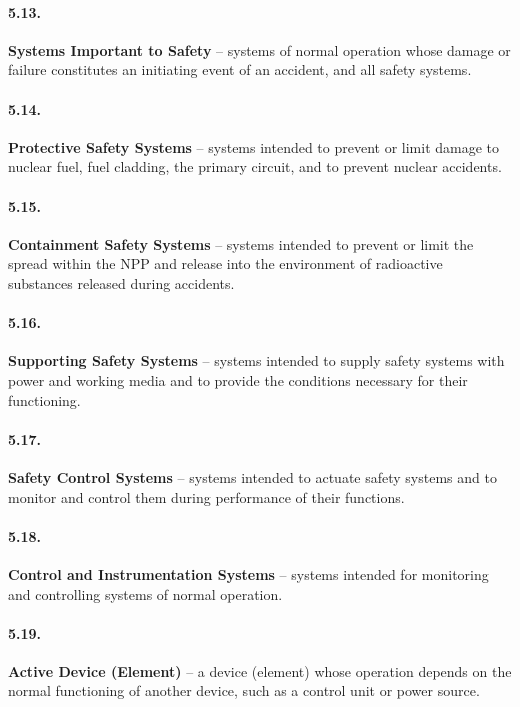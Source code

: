\documentclass[openright]{bookest}
\begin{document}
\paragraph{5.13.}
\textbf{Systems Important to Safety} -- systems of normal operation whose damage or failure constitutes an initiating event of an accident, and all safety systems.

\paragraph{5.14.}
\textbf{Protective Safety Systems} -- systems intended to prevent or limit damage to nuclear fuel, fuel cladding, the primary circuit, and to prevent nuclear accidents.

\paragraph{5.15.}
\textbf{Containment Safety Systems} -- systems intended to prevent or limit the spread within the NPP and release into the environment of radioactive substances released during accidents.

\paragraph{5.16.}
\textbf{Supporting Safety Systems} -- systems intended to supply safety systems with power and working media and to provide the conditions necessary for their functioning.

\paragraph{5.17.}
\textbf{Safety Control Systems} -- systems intended to actuate safety systems and to monitor and control them during performance of their functions.

\paragraph{5.18.}
\textbf{Control and Instrumentation Systems} -- systems intended for monitoring and controlling systems of normal operation.

\paragraph{5.19.}
\textbf{Active Device (Element)} -- a device (element) whose operation depends on the normal functioning of another device, such as a control unit or power source.
\end{document}
